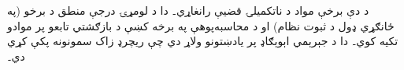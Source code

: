 \documentclass[../../include/open-logic-part]{subfiles}
\begin{document}

\begin{editorial}
  د دې برخې مواد د ناتکميلۍ قضيې رانغاړي۔ دا د لومړۍ درجې منطق د
  برخو (په ځانګړي ډول د ثبوت نظام) او د محاسبه‌پوهې په برخه کښې د
  بازګشتي تابعو پر موادو تکيه کوي۔ دا د جېرېمي اېوېګاډ پر يادښتونو
  ولاړ دي چې ريچرډ زاک سمونونه پکې کړي دي۔
\end{editorial}






\OLEndPartHook
\end{document}
